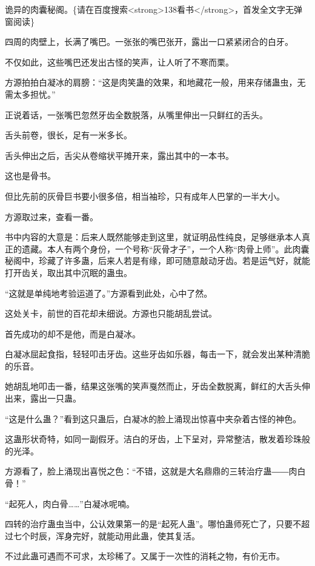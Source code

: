 
\begin{this_body}

诡异的肉囊秘阁。\{请在百度搜索<strong>138看书</strong>，首发全文字无弹窗阅读\}

四周的肉壁上，长满了嘴巴。一张张的嘴巴张开，露出一口紧紧闭合的白牙。

不仅如此，这些嘴巴还发出古怪的笑声，让人听了不寒而栗。

方源拍拍白凝冰的肩膀：“这是肉笑蛊的效果，和地藏花一般，用来存储蛊虫，无需太多担忧。”

正说着话，一张嘴巴忽然牙齿全数脱落，从嘴里伸出一只鲜红的舌头。

舌头前卷，很长，足有一米多长。

舌头伸出之后，舌尖从卷缩状平摊开来，露出其中的一本书。

这也是骨书。

但比先前的灰骨巨书要小很多倍，相当袖珍，只有成年人巴掌的一半大小。

方源取过来，查看一番。

书中内容的大意是：后来人既然能够走到这里，就证明品性纯良，足够继承本人真正的遗藏。本人有两个身份，一个号称“灰骨才子”，一个人称“肉骨上师”。此肉囊秘阁中，珍藏了许多蛊，后来人若是有缘，即可随意敲动牙齿。若是运气好，就能打开齿关，取出其中沉眠的蛊虫。

“这就是单纯地考验运道了。”方源看到此处，心中了然。

这处关卡，前世的百花却未细说。方源也只能胡乱尝试。

首先成功的却不是他，而是白凝冰。

白凝冰屈起食指，轻轻叩击牙齿。这些牙齿如乐器，每击一下，就会发出某种清脆的乐音。

她胡乱地叩击一番，结果这张嘴的笑声戛然而止，牙齿全数脱离，鲜红的大舌头伸出来，露出一只蛊。

“这是什么蛊？”看到这只蛊后，白凝冰的脸上涌现出惊喜中夹杂着古怪的神色。

这蛊形状奇特，如同一副假牙。洁白的牙齿，上下呈对，异常整洁，散发着珍珠般的光泽。

方源看了，脸上涌现出喜悦之色：“不错，这就是大名鼎鼎的三转治疗蛊――肉白骨！”

“起死人，肉白骨……”白凝冰呢喃。

四转的治疗蛊虫当中，公认效果第一的是“起死人蛊”。哪怕蛊师死亡了，只要不超过七个时辰，浑身完好，就能动用此蛊，使其复活。

不过此蛊可遇而不可求，太珍稀了。又属于一次性的消耗之物，有价无市。


\end{this_body}
